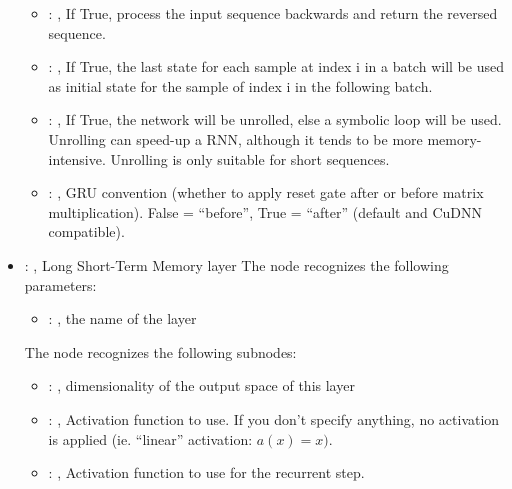 \begin{itemize}
\begin{itemize}
        \item {}: , 
          If True, process the input sequence backwards and return the reversed sequence.

        \item {}: , 
          If True, the last state for each sample at index i in a batch will be used as initial
          state for the         sample of index i in the following batch.

        \item {}: , 
          If True, the network will be unrolled, else a symbolic loop will be used. Unrolling can
          speed-up a         RNN, although it tends to be more memory-intensive. Unrolling is only
          suitable for short sequences.

        \item {}: , 
          GRU convention (whether to apply reset gate after or before matrix multiplication).
          False = ``before'', True = ``after'' (default and CuDNN compatible).
      \end{itemize}

    \item {}: , 
      Long Short-Term Memory layer
      The  node recognizes the following parameters:
        \begin{itemize}
          \item {}: , 
            the name of the layer
      \end{itemize}

      The  node recognizes the following subnodes:
      \begin{itemize}
        \item {}: , 
          dimensionality of the output space of this layer

        \item {}: , 
          Activation function to use. If you don't specify anything, no activation is applied (ie.
          ``linear''         activation: $a(x) = x)$.

        \item {}: , 
          Activation function to use for the recurrent step.


\end{itemize}
\end{itemize}
